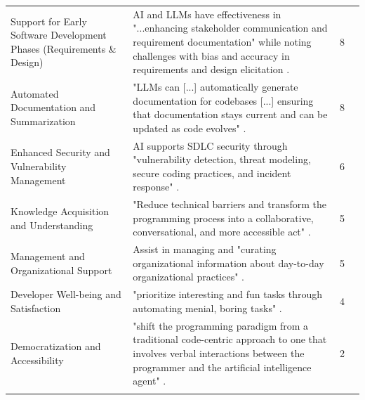 {\begin{longtable}{>{\raggedright\arraybackslash} p{3cm} p{9.3cm} p{0.2cm} >{\raggedright\arraybackslash}p{1.8cm}}
Support for Early Software Development Phases (Requirements \& Design) & AI and LLMs have effectiveness in "...enhancing stakeholder communication and requirement documentation" while noting challenges with bias and accuracy in requirements and design elicitation \cite{Kim:2025ao}. & 8 & \cite{Gao:2025cc, Terragni:2025fa, Hemmat:2025rd, Zhang:2025ea, Kim:2025ao, Durrani:2024ad, Jensen:2025me, Qiu:2025ft} \\ \addlinespace

Automated Documentation and Summarization & "LLMs can [...] automatically generate documentation for codebases [...] ensuring that documentation stays current and can be updated as code evolves" \cite{Haque:2025la}. & 8 & \cite{Terragni:2025fa, Haque:2025la, AlHashimi:2025er, Zhang:2025ea, Tkachuk:2025dc, Banh:2025cf, Jabrw:2025ss, Durrani:2024ad} \\ \addlinespace

Enhanced Security and Vulnerability Management & AI supports SDLC security through "vulnerability detection, threat modeling, secure coding practices, and incident response" \cite{AlHashimi:2025er}. & 6 & \cite{Terragni:2025fa, Yoo:2025sa, Qiu:2025ft, AlHashimi:2025er, Bai:2025ci, Jabrw:2025ss} \\ \addlinespace

Knowledge Acquisition and Understanding & "Reduce technical barriers and transform the programming process into a collaborative, conversational, and more accessible act" \cite{Zamfiroiu:2025ec}. & 5 & \cite{Zamfiroiu:2025ec, Banh:2025cf, Chen:2025es, Qiu:2025ft, Jensen:2025me} \\ \addlinespace

Management and Organizational Support & Assist in managing and "curating organizational information about day-to-day organizational practices" \cite{Jensen:2025me}. & 5 & \cite{Gao:2025cc, AlHashimi:2025er, Ahmed:2025ai, Durrani:2024ad, Zhang:2025ea} \\ \addlinespace

Developer Well-being and Satisfaction & "prioritize interesting and fun tasks through automating menial, boring tasks" \cite{Jensen:2025me}. & 4 & \cite{Jensen:2025me, Zhang:2025ea, Basha:2025tt, Qiu:2025ft} \\ \addlinespace

Democratization and Accessibility & "shift the programming paradigm from a traditional code-centric approach to one that involves verbal interactions between the programmer and the artificial intelligence agent" \cite{Zamfiroiu:2025ec}. & 2 & \cite{Zamfiroiu:2025ec, Moore:2025vc} \\ \addlinespace

\end{longtable}
}

